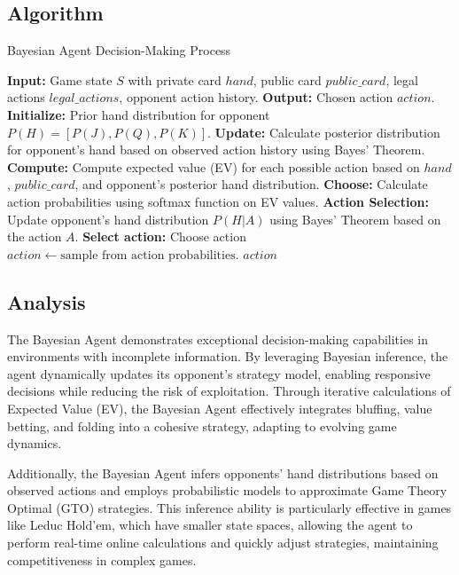 \documentclass{article}
\begin{document}
\subsection{Algorithm}
\begin{algorithm}[H]
\caption{Bayesian Agent Decision-Making Process}
\begin{algorithmic}[1]
\STATE \textbf{Input:} Game state $S$ with private card $hand$, public card $public\_card$, legal actions $legal\_actions$, opponent action history.
\STATE \textbf{Output:} Chosen action $action$.
\STATE \textbf{Initialize:} Prior hand distribution for opponent $P(H) = [P(J), P(Q), P(K)]$.
\STATE \textbf{Update:} Calculate posterior distribution for opponent's hand based on observed action history using Bayes' Theorem.
\STATE \textbf{Compute:} Compute expected value (EV) for each possible action based on $hand$, $public\_card$, and opponent's posterior hand distribution.
\STATE \textbf{Choose:} Calculate action probabilities using softmax function on EV values.
\STATE \textbf{Action Selection:}
    \STATE Update opponent's hand distribution $P(H | A)$ using Bayes' Theorem based on the action $A$.
\ENDIF
\STATE \textbf{Select action:} Choose action $action \gets \text{sample from action probabilities}$.
\RETURN $action$
\end{algorithmic}
\end{algorithm}
\subsection{Analysis}

The Bayesian Agent demonstrates exceptional decision-making capabilities in environments with incomplete information. By leveraging Bayesian inference, the agent dynamically updates its opponent's strategy model, enabling responsive decisions while reducing the risk of exploitation. Through iterative calculations of Expected Value (EV), the Bayesian Agent effectively integrates bluffing, value betting, and folding into a cohesive strategy, adapting to evolving game dynamics.

Additionally, the Bayesian Agent infers opponents' hand distributions based on observed actions and employs probabilistic models to approximate Game Theory Optimal (GTO) strategies. This inference ability is particularly effective in games like Leduc Hold'em, which have smaller state spaces, allowing the agent to perform real-time online calculations and quickly adjust strategies, maintaining competitiveness in complex games.
\end{document}
